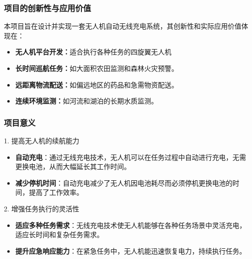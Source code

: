 \begin{frame}[fragile]
  \frametitle{项目的创新性与应用价值}
  本项目旨在设计并实现一套无人机自动无线充电系统，其创新性和实际应用价值体现在：
  \begin{itemize}
    \item \textbf{无人机平台开发：}适合执行各种任务的四旋翼无人机
    \item \textbf{长时间巡航任务：}如大面积农田监测和森林火灾预警。
    \item \textbf{远距离物流配送：}如偏远地区的药品和急需物资配送。
    \item \textbf{连续环境监测：}如河流和湖泊的长期水质监测。
  \end{itemize}
\end{frame}

\begin{frame}
  \frametitle{项目意义}
  
  \begin{block}{1. 提高无人机的续航能力}
      \begin{itemize}
          \item \textbf{自动充电}：通过无线充电技术，无人机可以在任务过程中自动进行充电，无需更换电池，从而大幅延长其工作时间。
          \item \textbf{减少停机时间}：自动充电减少了无人机因电池耗尽而必须停机更换电池的时间，提高了工作效率。
      \end{itemize}
  \end{block}
  
  \begin{block}{2. 增强任务执行的灵活性}
      \begin{itemize}
          \item \textbf{适应多种任务需求}：无线充电技术使无人机能够在各种任务场景中灵活充电，适应长时间和复杂任务需求。
          \item \textbf{提升应急响应能力}：在紧急任务中，无人机能迅速恢复电力，持续执行任务。
      \end{itemize}
  \end{block}
\end{frame}
  
